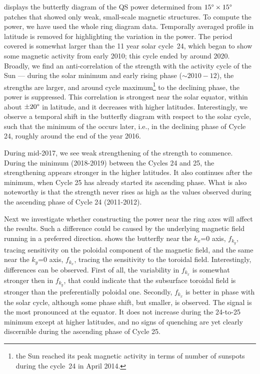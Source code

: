 \documentclass{aa}
\begin{document}
 displays the butterfly diagram of the 
QS
\fff power determined
from $15\degree \times 15\degree$ patches that showed only weak, small-scale magnetic structures.
To compute the \fff power, we have used the whole ring diagram data.
Temporally averaged profile in latitude is removed for highlighting the variation in the
\fff power. The period covered is somewhat larger than the 11 year solar cycle~24, which
began to show some magnetic activity from early 2010; this cycle ended by around 2020.
Broadly, we find an anti-correlation of the \fff strength with the activity cycle of the
Sun --- during the solar minimum and early rising phase ($\sim 2010-12$), the \fff strengths
are larger, and around cycle maximum\footnote{the Sun reached its peak magnetic activity
in terms of number of sunspots during the cycle~24 in April 2014.} to the declining phase,
the \fff power is suppressed.
This correlation is strongest near the solar equator, within about $\pm 20\degree$ in
latitude, and it decreases with higher latitudes.
Interestingly, we observe a temporal shift in the \fff butterfly diagram with respect to the
solar cycle, such that the minimum of the \fff occurs later, i.e., in the declining phase of
Cycle 24, roughly around the end of the year 2016.


During mid-2017, we see weak strengthening of the \fff strength to commence. During the minimum (2018-2019) between the Cycles 24 and 25, the strengthening appears stronger in the higher latitudes. It also continues after the minimum, when Cycle 25 has already started its ascending phase. What is also noteworthy is that the \fff strength never rises as high as the values observed during the ascending phase of Cycle 24 (2011-2012).


Next we investigate whether constructing the \fff power near
the ring axes will affect the results. Such a difference could be caused by the underlying magnetic field running in a preferred direction. 
 shows the butterfly near the $k_x$=0 axis, $f_{k_{y}}$, tracing \fff sensitivity on the poloidal component of the
magnetic field, and  the same near the $k_y$=0 axis,
$f_{k_{x}}$, tracing the sensitivity to the toroidal field. Interestingly,
differences can be observed. First of all, the variability in
$f_{k_{x}}$ is somewhat stronger then in $f_{k_{y}}$, that
could indicate that the subsurface toroidal field is stronger
than the preferentially poloidal one. Secondly, $f_{k_{x}}$ is
better in phase with the solar cycle, although some phase shift,
but smaller, is observed. The signal is the most pronounced
at the equator. It does not increase during the 24-to-25
minimum except at higher latitudes, and no signs of quenching
are yet clearly discernible during the ascending phase of Cycle 25. 
\end{document}
